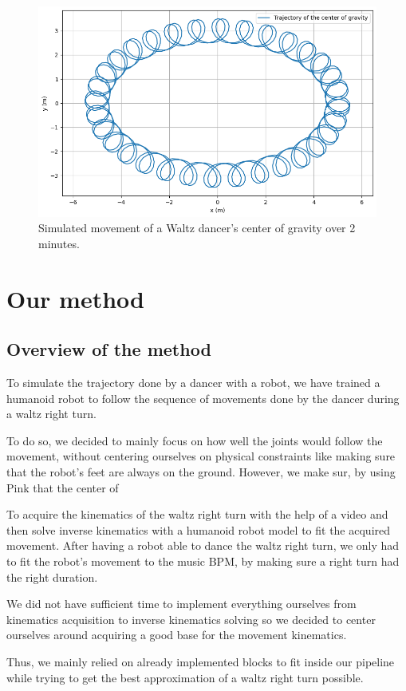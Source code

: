 \documentclass{amsart}
\theoremstyle{definition}
\theoremstyle{plain}
\begin{document}
\begin{figure}
  \centering
  \includegraphics[width = 0.5 \columnwidth]{img/waltz_cog_movement.png} 
  \caption{Simulated movement of a Waltz dancer's center of gravity over 2 minutes.}\label{fig:cog_movement}
\end{figure}


\section{Our method}


\subsection{Overview of the method}
To simulate the trajectory done by a dancer with a robot, we have trained a humanoid robot to follow the sequence of movements done by the dancer during a waltz right turn.

To do so, we decided to mainly focus on how well the joints would follow the movement, without centering ourselves on physical constraints like making sure that the robot's feet are always on the ground.
However, we make sur, by using Pink \cite{pink2024} that the center of 

To acquire the kinematics of the waltz right turn with the help of a video and then solve inverse kinematics with a humanoid robot model to fit the acquired movement. 
After having a robot able to dance the waltz right turn, we only had to fit the robot's movement to the music BPM, by making sure a right turn had the right duration.

We did not have sufficient time to implement everything ourselves from kinematics acquisition to inverse kinematics solving so we decided to center ourselves around acquiring a good base for the movement kinematics. 

Thus, we mainly relied on already implemented blocks to fit inside our pipeline while trying to get the best approximation of a waltz right turn possible.
\end{document}
